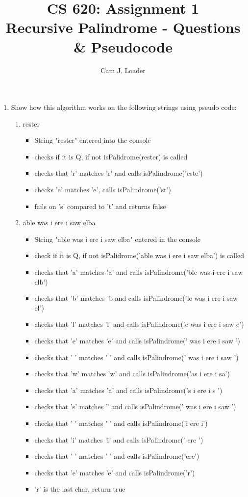 \documentclass[12pt]{article}
\title{CS 620: Assignment 1\\ Recursive Palindrome - Questions \& Pseudocode}
\author{Cam J. Loader}
\begin{document}
\maketitle

\begin{enumerate}
	\item Show how this algorithm works on the following strings using pseudo code:
	\begin{enumerate}
	   \item rester
	    \begin{itemize}
	    	\item String "rester" entered into the console
	    	\item checks if it is Q, if not isPalidrome(rester) is called
	    	\item checks that 'r' matches 'r' and calls isPalindrome('este')
	    	\item checks 'e' matches 'e', calls isPalindrome('st')
	    	\item fails on 's' compared to 't' and returns false    
	    \end{itemize}
	  \item able was i ere i saw elba
	  \begin{itemize}
	  	\item String "able was i ere i saw elba" entered in the console
	  	\item check if it is Q, if not isPalidrome('able was i ere i saw elba') is called
        \item checks that 'a' matches 'a' and calls  isPalindrome('ble was i ere i saw elb')
        \item checks that 'b' matches 'b and calls    isPalindrome('le was i ere i saw el')
	  	\item checks that 'l' matches 'l' and calls isPalindrome('e was i ere i saw e')
	  	\item checks that 'e' matches 'e' and calls  isPalindrome(' was i ere i saw ')
	  	\item checks that ' ' matches ' ' and calls  isPalindrome(' was i ere i saw ')
	  	\item checks that 'w' matches 'w' and calls  isPalindrome('as i ere i sa')
	  	\item checks that 'a' matches 'a' and calls  isPalindrome('s i ere i s ')
	  	\item checks that 's' matches '' and calls  isPalindrome(' was i ere i saw ')
	  	\item checks that ' ' matches ' ' and calls  isPalindrome('i ere i')
	  	\item checks that 'i' matches 'i' and calls  isPalindrome(' ere ')
	  	\item checks that ' ' matches ' ' and calls  isPalindrome('ere')
	  	\item checks that 'e' matches 'e' and calls  isPalindrome('r')
	  	\item 'r' is the last char, return true
	  \end{itemize}
	\end{enumerate}
\end{enumerate}
\end{document}
